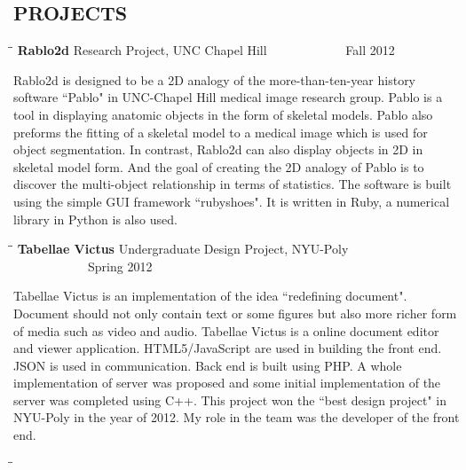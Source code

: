 \documentclass{res}
\begin{document}
\begin{resume}
\section{PROJECTS}
   \vspace{-0.05in}	
   \begin{tabbing}
   \hspace{2.3in}\= \hspace{2.6in}\= \kill %
    {\bf Rablo2d} \>Research Project, UNC Chapel Hill\> ~~~~~~~~~~~~Fall 2012\\
   \end{tabbing}\vspace{-20pt}
   Rablo2d is designed to be a 2D analogy of the more-than-ten-year history software ``Pablo" in UNC-Chapel Hill medical image research group. Pablo is a tool in displaying anatomic objects in the form of skeletal models. Pablo also preforms the fitting of a skeletal model to a medical image which is used for object segmentation. In contrast, Rablo2d can also display objects in 2D in skeletal model form. And the goal of creating the 2D analogy of Pablo is to discover the multi-object relationship in terms of statistics. The software is built using the simple GUI framework ``rubyshoes". It is written in Ruby, a numerical library in Python is also used.
   \begin{tabbing}
   \hspace{2.3in}\= \hspace{2.6in}\= \kill %
    {\bf Tabellae Victus} \>Undergraduate Design Project, NYU-Poly\> ~~~~~~~~~~~~Spring 2012\\
   \end{tabbing}\vspace{-20pt}
   Tabellae Victus is an implementation of the idea ``redefining document". Document should not only contain text or some figures but also more richer form of media such as video and audio. Tabellae Victus is a online document editor and viewer application. HTML5/JavaScript are used in building the front end. JSON is used in communication. Back end is built using PHP. A whole implementation of server was proposed and some initial implementation of the server was completed using C++. This project won the ``best design project" in NYU-Poly in the year of 2012. My role in the team was the developer of the front end.
  \begin{tabbing}
   \hspace{2.3in}\= \hspace{2.6in}\= \kill %

\end{tabbing}
\end{resume}
\end{document}
